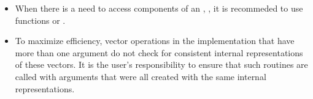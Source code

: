 \begin{itemize}

\item
  When there is a need to access components of an , ,
  it is recommeded to use functions  or
  .


\item
  {\warn}To maximize efficiency, vector operations in the {\nveccuda} implementation
  that have more than one  argument do not check for
  consistent internal representations of these vectors. It is the user's
  responsibility to ensure that such routines are called with 
  arguments that were all created with the same internal representations.

\end{itemize}

